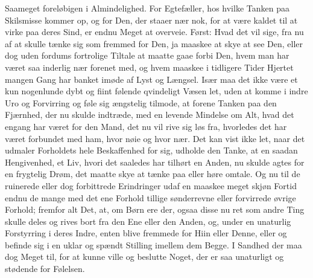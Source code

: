 \documentclass[12pt,a4paper]{book}
\newcommand{\apage}[1]{\marginnote{\footnotesize\textit{[#1]}}}
\begin{document}
Saameget foreløbigen i Almindelighed. For Egtefæller, hos hvilke Tanken
paa Skilsmisse kommer op, og for Den, der staaer nær nok, for at være
kaldet til at virke paa deres Sind, er endnu Meget at overveie. Først:
Hvad det vil sige, fra nu af at skulle tænke sig som fremmed for Den, ja
maaskee at skye at see Den, eller dog uden fordums fortrolige Tiltale at
maatte gaae forbi Den, hvem man har været saa inderlig nær forenet med,
og hvem maaskee i tidligere Tider Hjertet mangen Gang har banket imøde
af Lyst og Længsel. Især maa det ikke være et kun nogenlunde dybt og
fiint følende qvindeligt Væsen let, uden at komme i indre Uro og
Forvirring og føle sig ængstelig tilmode, at forene Tanken paa den
Fjærnhed, der nu skulde indtræde, med en levende Mindelse om Alt, hvad
det engang har været for den Mand, det nu vil rive sig løs fra,
hvorledes det har været forbundet med ham, hvor nøie og hvor nær. Det
kan vist ikke let, naar det udmaler Forholdets hele Beskaffenhed for
sig, udholde den Tanke,
\apage{140} at en saadan Hengivenhed, et Liv, hvori det saaledes har tilhørt en
Anden, nu skulde agtes for en frygtelig Drøm, det maatte skye at tænke
paa eller høre omtale. Og nu til de ruinerede eller dog forbittrede
Erindringer udaf en maaskee meget skjøn Fortid endnu de mange med det ene
Forhold tillige sønderrevne eller forvirrede øvrige Forhold; fremfor alt
Det, at, om Børn ere der, ogsaa disse nu ret som andre Ting skulle deles
og rives bort fra den Ene eller den Anden, og, under en unaturlig
Forstyrring i deres Indre, enten blive fremmede for Hiin eller Denne,
eller og befinde sig i en uklar og spændt Stilling imellem dem Begge. I
Sandhed der maa dog Meget til, for at kunne ville og beslutte Noget, der
er saa unaturligt og stødende for Følelsen.
\end{document}
